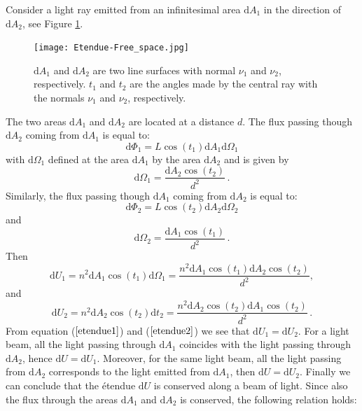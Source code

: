 Consider a light ray emitted from an infinitesimal area $\textrm{d}A_1$ in the direction of  $\textrm{d}A_2$,  see Figure \ref{fig:etendue_conservation}.
\begin{figure}[h]
 \label{fig:etendue_conservation}
     \begin{center}
     \texttt{[image: Etendue-Free\_space.jpg]}
     \end{center}
     \caption{\footnotesize{$\textrm{d}A_1$ and $\textrm{d}A_2$ are two line surfaces with normal $\nu_1$ and $\nu_2$, respectively. $t_1$ and $t_2$ are the angles made by the central ray with the normals $\nu_1$ and $\nu_2$, respectively.}}
\label{fig:etendue_conservation}
 \end{figure}
The two areas $\textrm{d}A_1$ and $\textrm{d}A_2$ are located at a distance $d$. The flux passing though $\textrm{d}A_2$ coming from $\textrm{d}A_1$ is equal to:
\begin{equation}
\textrm{d}\Phi_1 = L \cos(t_1) \textrm{d}A_1 \textrm{d}\Omega_1
\end{equation}
with $\textrm{d}\Omega_1$ defined at the area $\textrm{d}A_1$ by the area $\textrm{d}A_2$ and is given by 
\begin{equation}
\textrm{d}\Omega_1 = \frac{\textrm{d}A_2\cos(t_2)}{d^2}\,.
\end{equation}
Similarly, the flux passing though $\textrm{d}A_1$ coming from $\textrm{d}A_2$ is equal to:
\begin{equation}
\textrm{d}\Phi_2 = L \cos(t_2) \textrm{d}A_2 \textrm{d}\Omega_2
\end{equation}
and
\begin{equation}
\textrm{d}\Omega_2 = \frac{\textrm{d}A_1\cos(t_1)}{d^2}\,.
\end{equation}
Then \begin{equation}
\label{etendue1}
\textrm{d}U_1 = n^2 \textrm{d}A_1\cos(t_1)\textrm{d}\Omega_1= \frac{n^2 \textrm{d}A_1\cos(t_1)\textrm{d}A_2\cos(t_2)}{d^2},
\end{equation}
and
\begin{equation}
\label{etendue2}
\textrm{d}U_2 = n^2 \textrm{d}A_2\cos(t_2)\textrm{d}t_2= \frac{ n^2 \textrm{d}A_2\cos(t_2)\textrm{d}A_1\cos(t_2)}{d^2}\,.
\end{equation}
From equation ($\ref{etendue1}$) and ($\ref{etendue2}$) we see that $\textrm{d}U_1=\textrm{d}U_2$.
For a light beam, all the light passing through $\textrm{d}A_1$ coincides with the light passing through $\textrm{d}A_2$, hence $\textrm{d}U = \textrm{d}U_1$. Moreover, for the same light beam, all the light passing from $\textrm{d}A_2$ corresponds to the light emitted from $\textrm{d}A_1$, then $\textrm{d}U=\textrm{d}U_2$. Finally we can conclude that the \'{e}tendue $\textrm{d}U$ is conserved along a beam of light. Since also the flux through the areas $\textrm{d}A_1$ and $\textrm{d}A_2$ is conserved, the following relation holds:
